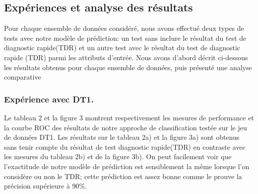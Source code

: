 \subsection{Expériences et analyse des résultats}
Pour chaque ensemble de données considéré, nous avons effectué deux types de tests avec notre modèle de prédiction: un test sans inclure le résultat du test de diagnostic rapide(TDR) et un autre test avec le résultat du test de diagnostic rapide (TDR) parmi les attributs d’entrée. Nous avons d'abord décrit ci-dessous les résultats obtenus pour chaque ensemble de données, puis présenté une analyse comparative
\subsubsection{Expérience avec DT1.}
Le tableau 2 et la figure 3 montrent respectivement les mesures de performance et la courbe ROC des résultats de notre approche de classification testée sur le jeu  de données DT1. Les résultats sur le tableau 2a) et la figure 3a) sont obtenus sans tenir compte du résultat de test diagnostic rapide(TDR) en contraste avec les mesures du tableau 2b) et de la figure 3b). On peut facilement voir que l'exactitude de notre modèle de prédiction est sensiblement la même lorsque l'on considère ou non le TDR; cette prédiction est assez bonne comme le prouve la précision supérieure à 90\%.
\begin{table}[!h]
\centering
{}%
\hspace*{0.5cm}
%
\label{perf-measure-dt1}\caption{Performance measures of the prediction on DT1}
\end{table}
